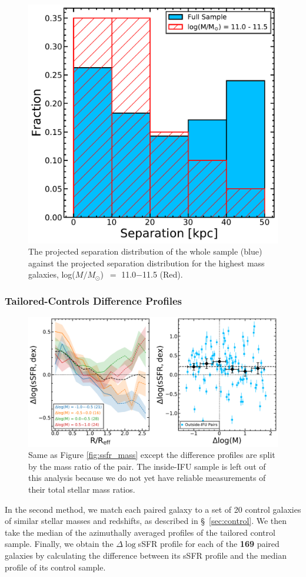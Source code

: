 \documentclass[iop,revtex4,twocolumn,apj,numberedappendix,appendixfloats]{emulateapj}
\newcommand{\logm}{log($M/M_{\odot}$)}
\begin{document}
\begin{figure}
\centering
\includegraphics[width=0.8\linewidth]{fig/sep_hist.pdf}
\caption[]{The projected separation distribution of the whole sample (blue) against the projected separation distribution for the highest mass galaxies, \logm\ $=$ 11.0$-$11.5 (Red). }
\label{fig:sep_hist}
\end{figure}

\subsubsection{Tailored-Controls Difference Profiles}\label{sec:tailored}
\begin{figure}
\centering
\includegraphics[width=0.8\linewidth]{fig/ssfr_dm.pdf}
\caption[]{Same as Figure \ref{fig:ssfr_mass} except the difference profiles are split by the mass ratio of the pair. The inside-IFU sample is left out of this analysis because we do not yet have reliable measurements of their total stellar mass ratios.}
\label{fig:ssfr_dm}
\end{figure}
In the second method, we match each paired galaxy to a set of 20 control galaxies of similar stellar masses and redshifts, as described in \S~\ref{sec:control}. We then take the median of the azimuthally averaged profiles of the tailored control sample. Finally, we obtain the $\Delta\log$sSFR profile for each of the \textbf{169} paired galaxies by calculating the difference between its sSFR profile and the median profile of its control sample.
\end{document}

